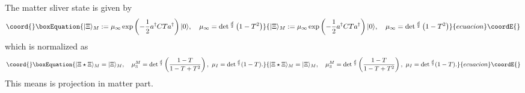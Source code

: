 \documentclass[12pt,a4paper]{article}
\begin{document}
The matter sliver state \coordHE{} is given by
\begin{equation}\coord{}\boxEquation{
|\Xi\rangle_M:=\mu_\infty \exp\left(-{1\over2}a^\dagger CTa^\dagger\right)|0\rangle,\ \ \ \mu_\infty=\det{}^{d\over2}\left(1-T^2\right)
}{
|\Xi\rangle_M:=\mu_\infty \exp\left(-{1\over2}a^\dagger CTa^\dagger\right)|0\rangle,\ \ \ \mu_\infty=\det{}^{d\over2}\left(1-T^2\right)
}{ecuacion}\coordE{}\end{equation}
which is normalized as
\begin{equation}\coord{}\boxEquation{
|\Xi\star\Xi\rangle_M=|\Xi\rangle_M,\ \ \ \mu_3^M=\det{}^{d\over2}\left({1-T\over1-T+T^2}\right),\ \mu_I=\det{}^{d\over2}(1-T).
}{
|\Xi\star\Xi\rangle_M=|\Xi\rangle_M,\ \ \ \mu_3^M=\det{}^{d\over2}\left({1-T\over1-T+T^2}\right),\ \mu_I=\det{}^{d\over2}(1-T).
}{ecuacion}\coordE{}\end{equation}
This means \coordHE{} is projection in matter part.
\end{document}
